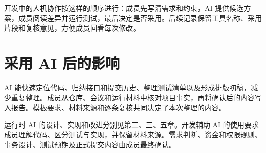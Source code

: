开发中的人机协作按这样的顺序进行：成员先写清需求和约束，AI 提供候选方案，成员阅读差异并运行测试，最后决定是否采用。后续记录保留工具名称、采用片段和复核意见，方便成员回看每次修改。
\section{采用 AI 后的影响}
AI 能快速定位代码、归纳接口和提交历史、整理测试清单以及形成排版初稿，减少重复整理。成员从仓库、会议和运行材料中核对项目事实，再将确认后的内容写入报告。模板要求、材料来源和逐条复核共同决定了本次整理的内容。

运行时 AI 的设计、实现和改进分别见第二、三、五章。开发辅助 AI 的使用要求成员理解代码、区分测试与实现，并保留材料来源。需求判断、资金和权限规则、事务设计、测试预期及正式提交内容由成员最终确认。
